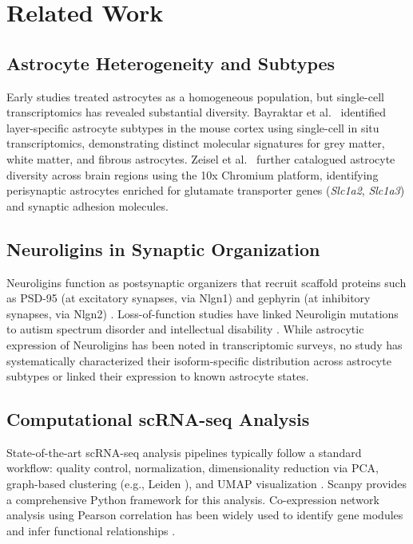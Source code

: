 \documentclass[sigconf]{acmart}
\begin{document}
\section{Related Work}

\subsection{Astrocyte Heterogeneity and Subtypes}
Early studies treated astrocytes as a homogeneous population, but single-cell transcriptomics has revealed substantial diversity. Bayraktar et al.\ \cite{bayraktar2020astrocyte} identified layer-specific astrocyte subtypes in the mouse cortex using single-cell in situ transcriptomics, demonstrating distinct molecular signatures for grey matter, white matter, and fibrous astrocytes. Zeisel et al.\ \cite{zeisel2018molecular} further catalogued astrocyte diversity across brain regions using the 10x Chromium platform, identifying perisynaptic astrocytes enriched for glutamate transporter genes (\textit{Slc1a2}, \textit{Slc1a3}) and synaptic adhesion molecules.

\subsection{Neuroligins in Synaptic Organization}
Neuroligins function as postsynaptic organizers that recruit scaffold proteins such as PSD-95 (at excitatory synapses, via Nlgn1) and gephyrin (at inhibitory synapses, via Nlgn2) \cite{varoqueaux2006neuroligins, chubykin2007activity}. Loss-of-function studies have linked Neuroligin mutations to autism spectrum disorder and intellectual disability \cite{jamain2003mutations, laumonnier2004x}. While astrocytic expression of Neuroligins has been noted in transcriptomic surveys, no study has systematically characterized their isoform-specific distribution across astrocyte subtypes or linked their expression to known astrocyte states.

\subsection{Computational scRNA-seq Analysis}
State-of-the-art scRNA-seq analysis pipelines typically follow a standard workflow: quality control, normalization, dimensionality reduction via PCA, graph-based clustering (e.g., Leiden \cite{traag2019louvain}), and UMAP visualization \cite{mcinnes2018umap}. Scanpy \cite{wolf2018scanpy} provides a comprehensive Python framework for this analysis. Co-expression network analysis using Pearson correlation has been widely used to identify gene modules and infer functional relationships \cite{langfelder2008wgcna}.
\end{document}
